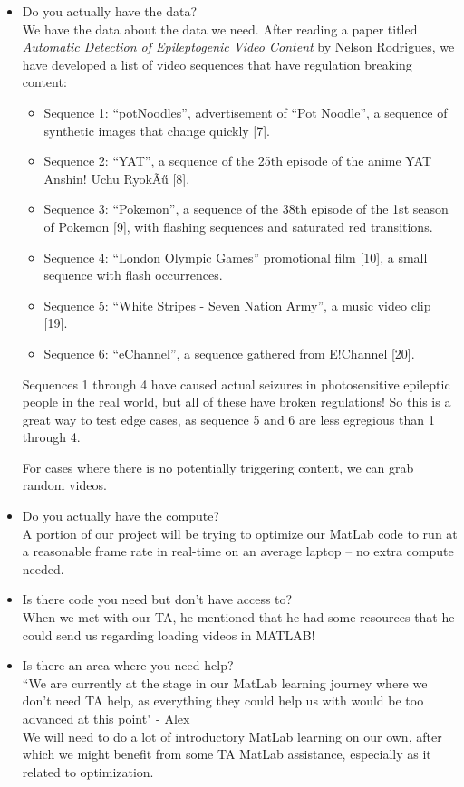\begin{itemize}
\item Do you actually have the data?\\
We have the data about the data we need. After reading a paper titled \textit{Automatic Detection of Epileptogenic Video Content} by Nelson Rodrigues, we have developed a list of video sequences that have regulation breaking content:
    \begin{itemize}
    \item Sequence 1: “potNoodles”, advertisement of “Pot Noodle”, a sequence of synthetic images that change quickly [7].
    \item Sequence 2: “YAT”, a sequence of the 25th episode of the anime YAT Anshin! Uchu RyokÃű [8]. 
    \item Sequence 3: “Pokemon”, a sequence of the 38th episode of the 1st season of Pokemon [9], with flashing sequences and saturated red transitions.
    \item Sequence 4: “London Olympic Games” promotional film [10], a small sequence with flash occurrences.
    \item Sequence 5: “White Stripes - Seven Nation Army”, a music video clip [19].
    \item Sequence 6: “eChannel”, a sequence gathered from E!Channel [20].
    \end{itemize}
Sequences 1 through 4 have caused actual seizures in photosensitive epileptic people in the real world, but all of these have broken regulations! So this is a great way to test edge cases, as sequence 5 and 6 are less egregious than 1 through 4.

For cases where there is no potentially triggering content, we can grab random videos.
\item Do you actually have the compute?\\
A portion of our project will be trying to optimize our MatLab code to run at a reasonable frame rate in real-time on an average laptop -- no extra compute needed.

\item Is there code you need but don't have access to?\\
When we met with our TA, he mentioned that he had some resources that he could send us regarding loading videos in MATLAB!

\item Is there an area where you need help?\\
``We are currently at the stage in our MatLab learning journey where we don't need TA help, as everything they could help us with would be too advanced at this point" - Alex \\
We will need to do a lot of introductory MatLab learning on our own, after which we might benefit from some TA MatLab assistance, especially as it related to optimization.

\end{itemize}



